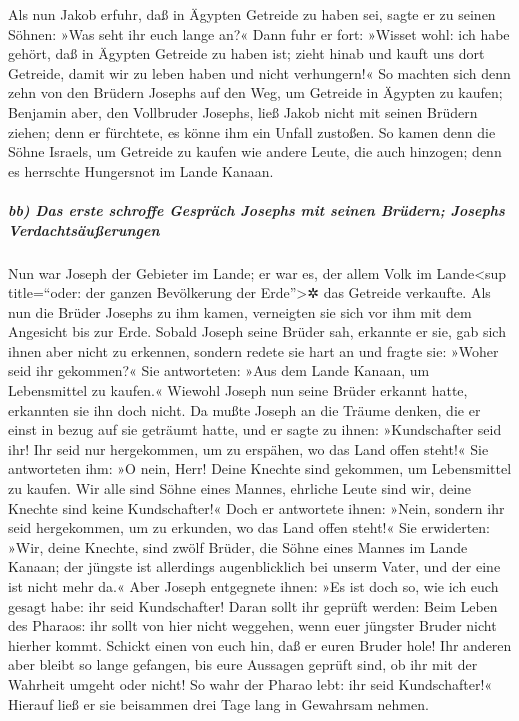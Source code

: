  Als nun Jakob erfuhr, daß in Ägypten Getreide zu haben
sei, sagte er zu seinen Söhnen: »Was seht ihr euch lange an?«
 Dann fuhr er fort: »Wisset wohl: ich habe gehört, daß in
Ägypten Getreide zu haben ist; zieht hinab und kauft uns dort Getreide,
damit wir zu leben haben und nicht verhungern!«  So
machten sich denn zehn von den Brüdern Josephs auf den Weg, um Getreide
in Ägypten zu kaufen;  Benjamin aber, den Vollbruder
Josephs, ließ Jakob nicht mit seinen Brüdern ziehen; denn er fürchtete,
es könne ihm ein Unfall zustoßen.  So kamen denn die Söhne
Israels, um Getreide zu kaufen wie andere Leute, die auch hinzogen; denn
es herrschte Hungersnot im Lande Kanaan.

\hypertarget{bb-das-erste-schroffe-gespruxe4ch-josephs-mit-seinen-bruxfcdern-josephs-verdachtsuxe4uuxdferungen}{%
\subparagraph{bb) Das erste schroffe Gespräch Josephs mit seinen
Brüdern; Josephs
Verdachtsäußerungen}\label{bb-das-erste-schroffe-gespruxe4ch-josephs-mit-seinen-bruxfcdern-josephs-verdachtsuxe4uuxdferungen}}

 Nun war Joseph der Gebieter im Lande; er war es, der
allem Volk im Lande\textless sup title=``oder: der ganzen Bevölkerung
der Erde''\textgreater✲ das Getreide verkaufte. Als nun die Brüder
Josephs zu ihm kamen, verneigten sie sich vor ihm mit dem Angesicht bis
zur Erde.  Sobald Joseph seine Brüder sah, erkannte er
sie, gab sich ihnen aber nicht zu erkennen, sondern redete sie hart an
und fragte sie: »Woher seid ihr gekommen?« Sie antworteten: »Aus dem
Lande Kanaan, um Lebensmittel zu kaufen.«  Wiewohl Joseph
nun seine Brüder erkannt hatte, erkannten sie ihn doch nicht.
 Da mußte Joseph an die Träume denken, die er einst in
bezug auf sie geträumt hatte, und er sagte zu ihnen: »Kundschafter seid
ihr! Ihr seid nur hergekommen, um zu erspähen, wo das Land offen steht!«
 Sie antworteten ihm: »O nein, Herr! Deine Knechte sind
gekommen, um Lebensmittel zu kaufen.  Wir alle sind Söhne
eines Mannes, ehrliche Leute sind wir, deine Knechte sind keine
Kundschafter!«  Doch er antwortete ihnen: »Nein, sondern
ihr seid hergekommen, um zu erkunden, wo das Land offen steht!«
 Sie erwiderten: »Wir, deine Knechte, sind zwölf Brüder,
die Söhne eines Mannes im Lande Kanaan; der jüngste ist allerdings
augenblicklich bei unserm Vater, und der eine ist nicht mehr da.«
 Aber Joseph entgegnete ihnen: »Es ist doch so, wie ich
euch gesagt habe: ihr seid Kundschafter!  Daran sollt ihr
geprüft werden: Beim Leben des Pharaos: ihr sollt von hier nicht
weggehen, wenn euer jüngster Bruder nicht hierher kommt. 
Schickt einen von euch hin, daß er euren Bruder hole! Ihr anderen aber
bleibt so lange gefangen, bis eure Aussagen geprüft sind, ob ihr mit der
Wahrheit umgeht oder nicht! So wahr der Pharao lebt: ihr seid
Kundschafter!«  Hierauf ließ er sie beisammen drei Tage
lang in Gewahrsam nehmen.


